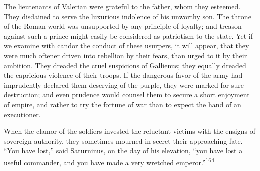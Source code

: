 



The lieutenants of Valerian were grateful to the father, whom
they esteemed. They disdained to serve the luxurious indolence of
his unworthy son. The throne of the Roman world was unsupported
by any principle of loyalty; and treason against such a prince
might easily be considered as patriotism to the state. Yet if we
examine with candor the conduct of these usurpers, it will
appear, that they were much oftener driven into rebellion by
their fears, than urged to it by their ambition. They dreaded the
cruel suspicions of Gallienus; they equally dreaded the
capricious violence of their troops. If the dangerous favor of
the army had imprudently declared them deserving of the purple,
they were marked for sure destruction; and even prudence would
counsel them to secure a short enjoyment of empire, and rather to
try the fortune of war than to expect the hand of an executioner.

When the clamor of the soldiers invested the reluctant victims
with the ensigns of sovereign authority, they sometimes mourned
in secret their approaching fate. “You have lost,” said
Saturninus, on the day of his elevation, “you have lost a useful
commander, and you have made a very wretched emperor.”\textsuperscript{164}


